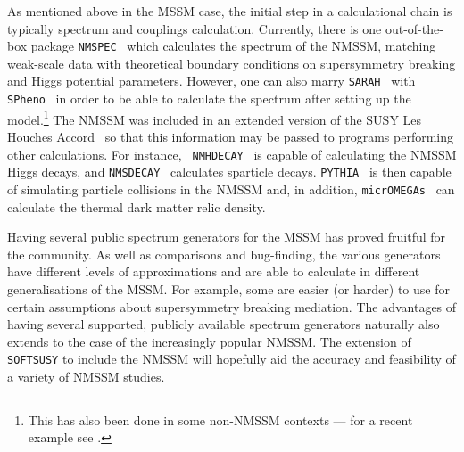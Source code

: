 \documentclass[final,3p,times,pdflatex]{elsarticle}
\def\code#1{\small{\tt #1}\normalsize}
\begin{document}
As mentioned above in the MSSM case, the initial step in a calculational
chain is 
typically spectrum and couplings calculation. Currently, there is one
out-of-the-box package {\tt NMSPEC}~\cite{Ellwanger:2006rn} which calculates
the spectrum of the 
NMSSM, matching weak-scale data with theoretical boundary conditions on
supersymmetry breaking and Higgs potential parameters. However, one can also 
marry {\tt SARAH}~\cite{Staub:2009bi,Staub:2010jh,Staub:2012pb,Staub:2013tta} with {\tt
  SPheno}~\cite{Porod:2003um} in order to be 
able to 
calculate the spectrum after setting up the model.\footnote{This has also been done in some non-NMSSM contexts --- for a recent example see \cite{Bharucha:2013ela}.} The NMSSM was included in
an extended version of the SUSY Les Houches Accord~\cite{Allanach:2008qq} so
that this 
information may be passed to programs performing other calculations. For
instance, 
{\tt
  NMHDECAY}~\cite{Ellwanger:2005dv} is 
capable of calculating the NMSSM Higgs decays, and
{\tt NMSDECAY}~\cite{Muhlleitner:2003vg,Das:2011dg} calculates sparticle
decays. \code{PYTHIA}~\cite{Sjostrand:2007gs} is then capable of simulating
particle collisions in the NMSSM and, in addition, \code{micrOMEGAs}~\cite{Belanger:2008sj}
can calculate the thermal dark matter relic density.

Having several public spectrum generators for the MSSM has proved fruitful for
the community. As well as comparisons and bug-finding, the various generators
have different levels of approximations and are able to calculate in different
generalisations of the MSSM. For example, some are easier (or harder) to use for certain
assumptions about supersymmetry breaking mediation. 
The advantages of having
several supported, publicly available spectrum generators naturally also
extends to the 
case of the increasingly popular NMSSM.
The extension of {\tt SOFTSUSY} to include the
NMSSM will hopefully aid the
accuracy and feasibility of a variety of NMSSM studies. 
\end{document}
